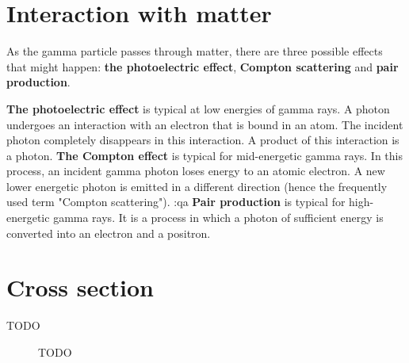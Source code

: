 \section{Interaction with matter}
As the gamma particle passes through matter, there are three possible effects that might happen:
\textbf{the photoelectric effect}, \textbf{Compton scattering} and \textbf{pair production}.

\textbf{The photoelectric effect} is typical at low energies of gamma rays. A photon undergoes an interaction with an electron that is bound in an atom. The incident photon completely disappears in this interaction. A product of this interaction is a photon.
\textbf{The Compton effect} is typical for mid-energetic gamma rays. In this process, an incident gamma photon loses energy to an atomic electron. A new lower energetic photon is emitted in a different direction (hence the frequently used term "Compton scattering").
:qa
\textbf{Pair production} is typical for high-energetic gamma rays. It is a process in which a photon of sufficient energy is converted into an electron and a positron.

\section{Cross section}
TODO

\begin{figure}[!h]
  \centering
  \caption{TODO}
  \label{fig:xxx}
\end{figure}
